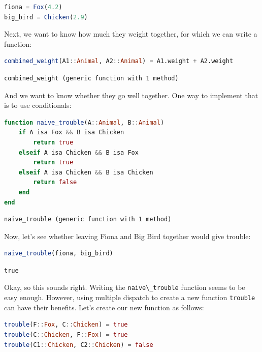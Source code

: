 \documentclass[
  notoc %
]{tufte-book}
\newcommand{\passthrough}[1]{#1}
\begin{document}
\begin{lstlisting}[language=Julia]
fiona = Fox(4.2)
big_bird = Chicken(2.9)
\end{lstlisting}

Next, we want to know how much they weight together, for which we can
write a function:

\begin{lstlisting}[language=Julia]
combined_weight(A1::Animal, A2::Animal) = A1.weight + A2.weight
\end{lstlisting}

\begin{lstlisting}[language=Output]
combined_weight (generic function with 1 method)
\end{lstlisting}

And we want to know whether they go well together. One way to implement
that is to use conditionals:

\begin{lstlisting}[language=Julia]
function naive_trouble(A::Animal, B::Animal)
    if A isa Fox && B isa Chicken
        return true
    elseif A isa Chicken && B isa Fox
        return true
    elseif A isa Chicken && B isa Chicken
        return false
    end
end
\end{lstlisting}

\begin{lstlisting}[language=Output]
naive_trouble (generic function with 1 method)
\end{lstlisting}

Now, let's see whether leaving Fiona and Big Bird together would give
trouble:

\begin{lstlisting}[language=Julia]
naive_trouble(fiona, big_bird)
\end{lstlisting}

\begin{lstlisting}[language=Output]
true
\end{lstlisting}

Okay, so this sounds right. Writing the
\passthrough{\lstinline!naive\_trouble!} function seems to be easy
enough. However, using multiple dispatch to create a new function
\passthrough{\lstinline!trouble!} can have their benefits. Let's create
our new function as follows:

\begin{lstlisting}[language=Julia]
trouble(F::Fox, C::Chicken) = true
trouble(C::Chicken, F::Fox) = true
trouble(C1::Chicken, C2::Chicken) = false
\end{lstlisting}
\end{document}
